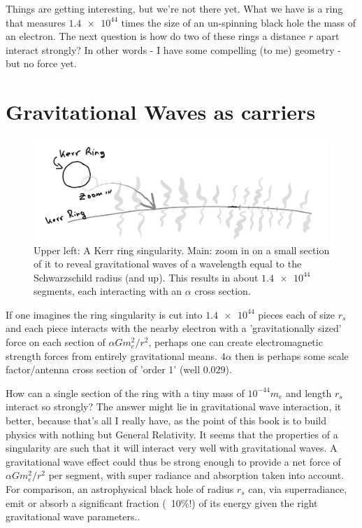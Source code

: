 \documentclass[../rzero]{subfiles}
\begin{document}
Things are getting interesting, but we're not there yet. What we have is a ring that measures $\num{1.4e44}$ times the size of an un-spinning black hole the mass of an electron. The next question is how do two of these rings a distance $r$ apart interact strongly? In other words - I have some compelling (to me) geometry - but no force yet. 


\section{Gravitational Waves as carriers}

\begin{figure}
\includegraphics[width=0.99\textwidth]{chapters/images/kerr-electric.png}
\caption{Upper left: A Kerr ring singularity. Main: zoom in on a small section of it to reveal gravitational waves of a wavelength equal to the Schwarzschild radius (and up). This results in about $\num{1.4e44}$ segments, each interacting with an $\alpha$ cross section.}
\label{kerr-electric-image}
\end{figure}



 If one imagines the ring singularity is cut into $\num{1.4e44} $ pieces each of size $r_s$ and each piece interacts with the nearby electron with a 'gravitationally sized' force on each section of $\alpha G m_e^2/r^2 $, perhaps one can create electromagnetic strength forces from entirely gravitational means. $4\alpha$ then is perhaps some scale factor/antenna cross section of 'order 1' (well $ 0.029$).
   
 How can a single section of the ring with a tiny mass of $ 10^{-44}m_e $ and length $r_s$ interact so strongly? The answer might lie in gravitational wave interaction, it better, because that's all I really have, as the point of this book is to build physics with nothing but General Relativity.  It seems that the properties of a singularity are such that it will interact very well\cite{Nakamura1993} with gravitational waves. A gravitational wave effect could thus be strong enough to provide a net force of $\alpha G m_e^2/r^2 $ per segment, with super radiance and absorption taken into account. For comparison, an astrophysical black hole of radius $r_s$ can, via superradiance, emit or absorb a significant fraction (~10\%!) of its energy given the right gravitational wave parameters.\cite{Brito2015}.  
  
\end{document}

